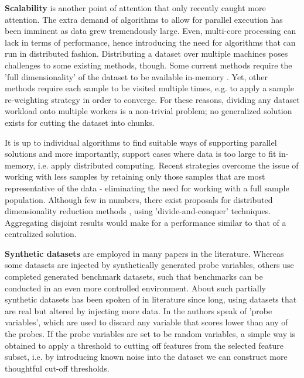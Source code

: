 \documentclass{article}
\begin{document}
\textbf{Scalability} is another point of attention that only recently caught more attention. The extra demand of algorithms to allow for parallel execution has been imminent as data grew tremendously large. Even, multi-core processing can lack in terms of performance, hence introducing the need for algorithms that can run in distributed fashion. Distributing a dataset over multiple machines poses challenges to some existing methods, though. Some current methods require the 'full dimensionality' of the dataset to be available in-memory \citep{tang_feature_2014}. Yet, other methods require each sample to be visited multiple times, e.g. to apply a sample re-weighting strategy in order to converge. For these reasons, dividing any dataset workload onto multiple workers is a non-trivial problem; no generalized solution exists for cutting the dataset into chunks.

It is up to individual algorithms to find suitable ways of supporting parallel solutions and more importantly, support cases where data is too large to fit in-memory, i.e. apply distributed computing. Recent strategies overcome the issue of working with less samples by retaining only those samples that are most representative of the data - eliminating the need for working with a full sample population. Although few in numbers, there exist proposals for distributed dimensionality reduction methods \citep{li_distributed_2020}, using 'divide-and-conquer' techniques. Aggregating disjoint results would make for a performance similar to that of a centralized solution.

\textbf{Synthetic datasets} are employed in many papers in the literature. Whereas some datasets are injected by synthetically generated probe variables, others use completed generated benchmark datasets, such that benchmarks can be conducted in an even more controlled environment.
About such partially synthetic datasets has been spoken of in literature since long, using datasets that are real but altered by injecting more data. In \citep{guyon_introduction_2003} the authors speak of 'probe variables', which are used to discard any variable that scores lower than any of the probes. If the probe variables are set to be random variables, a simple way is obtained to apply a threshold to cutting off features from the selected feature subset, i.e. by introducing known noise into the dataset we can construct more thoughtful cut-off thresholds.
\end{document}
